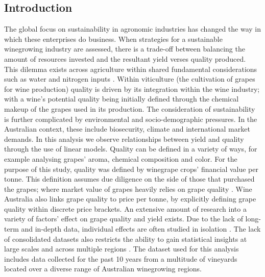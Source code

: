 \documentclass[review,12pt,authoryear]{elsarticle}
\begin{document}
\begin{linenumbers}
\section{Introduction}
The global focus on sustainability in agronomic industries has changed the way in which these enterprises do business. When strategies for a sustainable winegrowing industry are assessed, there is a trade-off between balancing the amount of resources invested and the resultant yield verses quality produced. This dilemma exists across agriculture within shared fundamental considerations such as water and nitrogen inputs \citep{hemmingCherryTomatoProduction2020,kawasakiQualityMattersMore2016, zhuEffectsNitrogenLevel2017}. Within viticulture (the cultivation of grapes for wine production) quality is driven by its integration within the wine industry; with a wine's potential quality being initially defined through the chemical makeup of the grapes used in its production. The consideration of sustainability is further complicated by environmental and socio-demographic pressures. In the Australian context, these include biosecurity, climate and international market demands.
\newline
In this analysis we observe relationships between yield and quality through the use of linear models. Quality can be defined in a variety of ways, for example analysing grapes' aroma, chemical composition and color. For the purpose of this study, quality was defined by winegrape crops' financial value per tonne. This definition assumes due diligence on the side of those that purchased the grapes; where market value of grapes heavily relies on grape quality \citep{yeggeInfluenceSensoryNonsensory2001}. Wine Australia also links grape quality to price per tonne, by explicitly defining grape quality within discrete price brackets.
\newline
An extensive amount of research into a variety of factors' effect on grape quality and yield exists.
Due to the lack of long-term and in-depth data, individual effects are often studied in isolation \citep{abbalDecisionSupportSystem2016}. The lack of consolidated datasets also restricts the ability to gain statistical insights at large scales and across multiple regions \citep{keithjonesAustralianWineIndustry2002,knightFirmResourcesDevelopment2019}. The dataset used for this analysis includes data collected for the past 10 years from a multitude of vineyards located over a diverse range of Australian winegrowing regions.
\newline

\end{linenumbers}
\end{document}
